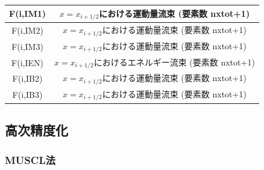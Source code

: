 \begin{table}[h]
\begin{center}
\begin{tabular}{|c|c|}
    \hline
    {\ttfamily F(i,IM1)} & $x=x_{i+1/2}$における運動量流束 (要素数 {\ttfamily nxtot+1}) \\
    \hline
    {\ttfamily F(i,IM2)} & $x=x_{i+1/2}$における運動量流束 (要素数 {\ttfamily nxtot+1}) \\
    \hline
    {\ttfamily F(i,IM3)} & $x=x_{i+1/2}$における運動量流束 (要素数 {\ttfamily nxtot+1}) \\
    \hline
    {\ttfamily F(i,IEN)} & $x=x_{i+1/2}$におけるエネルギー流束 (要素数 {\ttfamily nxtot+1}) \\
    \hline
    {\ttfamily F(i,IB2)} & $x=x_{i+1/2}$における運動量流束 (要素数 {\ttfamily nxtot+1}) \\
    \hline
    {\ttfamily F(i,IB3)} & $x=x_{i+1/2}$における運動量流束 (要素数 {\ttfamily nxtot+1}) \\
    \hline
\end{tabular}
\end{center}
\label{tab:mhdvar}
\end{table}



\clearpage
\subsection{高次精度化}

\subsubsection{MUSCL法}

